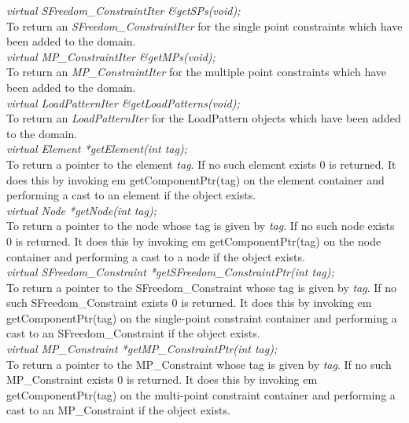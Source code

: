 {\em virtual SFreedom\_ConstraintIter \&getSPs(void);} \\
To return an {\em SFreedom\_ConstraintIter} for the single point constraints
which have been added to the domain. \\ 

{\em virtual MP\_ConstraintIter \&getMPs(void);} \\
To return an {\em MP\_ConstraintIter} for the multiple point
constraints which have been added to the domain. \\ 

{\em virtual LoadPatternIter \&getLoadPatterns(void);} \\
To return an {\em LoadPatternIter} for the LoadPattern
objects which have been added to the domain. \\ 

{\em virtual  Element *getElement(int tag);}\\
To return a pointer to the element {\em tag}. If no such element
exists $0$ is returned. It does this by invoking {em
getComponentPtr(tag)} on the element container and performing a cast
to an element if the object exists. \\

{\em virtual  Node *getNode(int tag);}\\
To return a pointer to the node whose tag is given by {\em tag}. If
no such node exists $0$ is returned. It does this by invoking {em
getComponentPtr(tag)} on the node container and performing a cast
to a node if the object exists. \\

{\em virtual  SFreedom\_Constraint *getSFreedom\_ConstraintPtr(int tag);}\\
To return a pointer to the SFreedom\_Constraint whose tag is given by {\em tag}. If
no such SFreedom\_Constraint exists $0$ is returned. It does this by invoking {em
getComponentPtr(tag)} on the single-point constraint container and
performing a cast to an SFreedom\_Constraint if the object exists. \\


{\em virtual  MP\_Constraint *getMP\_ConstraintPtr(int tag);}\\
To return a pointer to the MP\_Constraint whose tag is given by {\em tag}. If
no such MP\_Constraint exists $0$ is returned. It does this by invoking {em
getComponentPtr(tag)} on the multi-point constraint container and
performing a cast to an MP\_Constraint if the object exists. \\


